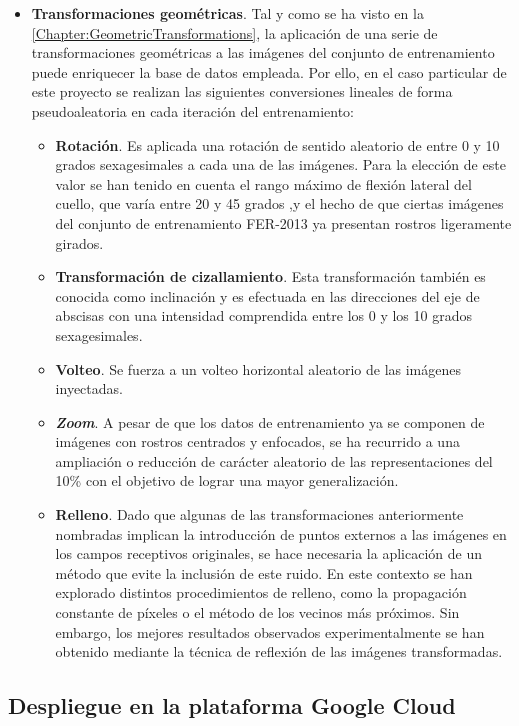 \begin{itemize}
  \item \textbf{Transformaciones geométricas}. Tal y como se ha visto en la \autoref{Chapter:GeometricTransformations}, la aplicación de una serie de transformaciones geométricas a las imágenes del conjunto de entrenamiento puede enriquecer la base de datos empleada. Por ello, en el caso particular de este proyecto se realizan las siguientes conversiones lineales de forma pseudoaleatoria en cada iteración del entrenamiento:
        \begin{itemize}
          \item \textbf{Rotación}. Es aplicada una rotación de sentido aleatorio de entre 0 y 10 grados sexagesimales a cada una de las imágenes. Para la elección de este valor se han tenido en cuenta el rango máximo de flexión lateral del cuello, que varía entre 20 y 45 grados \cite{LateralFlexion},y el hecho de que ciertas imágenes del conjunto de entrenamiento FER-2013 ya presentan rostros ligeramente girados.
          \item \textbf{Transformación de cizallamiento}. Esta transformación también es conocida como inclinación y es efectuada en las direcciones del eje de abscisas con una intensidad comprendida entre los 0 y los 10 grados sexagesimales.
          \item \textbf{Volteo}. Se fuerza a un volteo horizontal aleatorio de las imágenes inyectadas. 
          \item \textbf{\textit{Zoom}}. A pesar de que los datos de entrenamiento ya se componen de imágenes con rostros centrados y enfocados, se ha recurrido a una ampliación o reducción de carácter aleatorio de las representaciones del 10\% con el objetivo de lograr una mayor generalización.
          \item \textbf{Relleno}. Dado que algunas de las transformaciones anteriormente nombradas implican la introducción de puntos externos a las imágenes en los campos receptivos originales, se hace necesaria la aplicación de un método que evite la inclusión de este ruido. En este contexto se han explorado distintos procedimientos de relleno, como la propagación constante de píxeles o el método de los vecinos más próximos. Sin embargo, los mejores resultados observados experimentalmente se han obtenido mediante la técnica de reflexión de las imágenes transformadas.
        \end{itemize}
\end{itemize}

\subsection{Despliegue en la plataforma Google Cloud}


